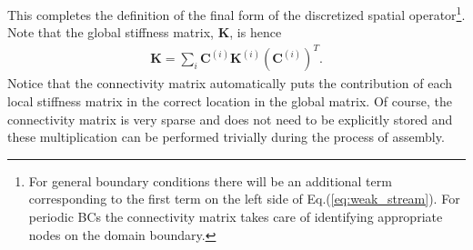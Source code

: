 \documentclass[11pt, reqno]{amsart}
\newcommand{\eqr}[1]{Eq.\thinspace(#1)}
\newcommand{\mvec}[1]{\mathbf{#1}}
\theoremstyle{definition}
\begin{document}
This completes the definition of the final form of the discretized
spatial operator\footnote{For general boundary conditions there will
  be an additional term corresponding to the first term on the left
  side of \eqr{\ref{eq:weak_stream}}. For periodic BCs the
  connectivity matrix takes care of identifying appropriate nodes on
  the domain boundary.}. Note that the global stiffness matrix,
$\mvec{K}$, is hence
\begin{align}
  \mvec{K}
  =
  \sum_i
  \mvec{C}^{(i)}
  \mvec{K}^{(i)}
  (\mvec{C}^{(i)})^T.
\end{align}
Notice that the connectivity matrix automatically puts the
contribution of each local stiffness matrix in the correct location in
the global matrix. Of course, the connectivity matrix is very sparse
and does not need to be explicitly stored and these multiplication can
be performed trivially during the process of assembly.
\end{document}
